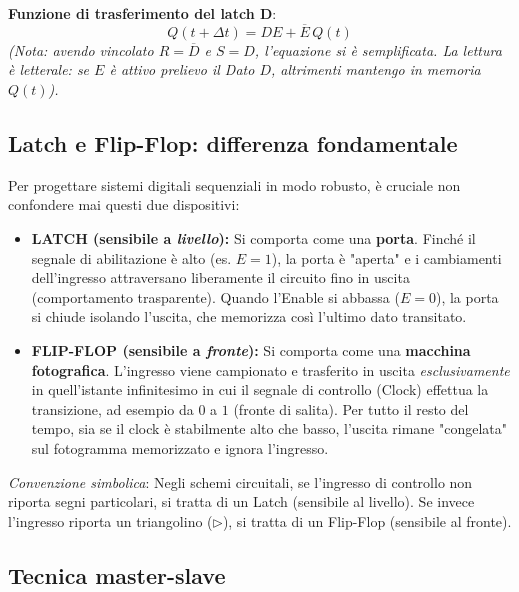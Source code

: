 \noindent\textbf{Funzione di trasferimento del latch D}:
\[
\boxed{Q(t+\Delta t) = DE + \overline{E}\,Q(t)}
\]
\emph{(Nota: avendo vincolato $R=\overline{D}$ e $S=D$, l'equazione si è semplificata. La lettura è letterale: se $E$ è attivo prelievo il Dato $D$, altrimenti mantengo in memoria $Q(t)$).}

\subsection{Latch e Flip-Flop: differenza fondamentale}

Per progettare sistemi digitali sequenziali in modo robusto, è cruciale non confondere mai questi due dispositivi:

\begin{important}
\begin{itemize}[leftmargin=1.5em,itemsep=4pt]
  \item \textbf{LATCH (sensibile a \emph{livello}):} Si comporta come una \textbf{porta}. Finché il segnale di abilitazione è alto (es. $E=1$), la porta è "aperta" e i cambiamenti dell'ingresso attraversano liberamente il circuito fino in uscita (comportamento trasparente). Quando l'Enable si abbassa ($E=0$), la porta si chiude isolando l'uscita, che memorizza così l'ultimo dato transitato.
  \item \textbf{FLIP-FLOP (sensibile a \emph{fronte}):} Si comporta come una \textbf{macchina fotografica}. L'ingresso viene campionato e trasferito in uscita \emph{esclusivamente} in quell'istante infinitesimo in cui il segnale di controllo (Clock) effettua la transizione, ad esempio da $0$ a $1$ (fronte di salita). Per tutto il resto del tempo, sia se il clock è stabilmente alto che basso, l'uscita rimane "congelata" sul fotogramma memorizzato e ignora l'ingresso.
\end{itemize}
\end{important}

\noindent\textit{Convenzione simbolica}: Negli schemi circuitali, se l'ingresso di controllo non riporta segni particolari, si tratta di un Latch (sensibile al livello). Se invece l'ingresso riporta un triangolino ($\triangleright$), si tratta di un Flip-Flop (sensibile al fronte).

\subsection{Tecnica master-slave}

